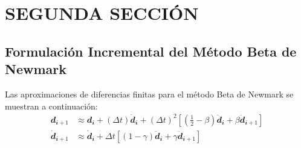 \section{SEGUNDA SECCIÓN}
	
	\subsection{Formulación Incremental del Método Beta de Newmark}

Las aproximaciones de diferencias finitas para el método Beta de Newmark se muestran a continuación:
\begin{subequations}\label{Cap3_Eq15}
  \begin{align}
\mathbfit{d_{i+1}}&\approx \mathbfit{d_{i}}+(\Delta t) \mathbfit{\dot{d}_{i}}+(\Delta t)^2\left[\left(\frac{1}{2}-\beta\right)\mathbfit{\ddot{d}_{i}}+\beta\mathbfit{\ddot{d}_{i+1}} \right]		\label{Cap3_Eq15_1} \\[2 mm]
\mathbfit{\dot{d}_{i+1}}&\approx \mathbfit{\dot{d}_{i}}+\Delta t\left [(1-\gamma)\mathbfit{\ddot{d}_{i}}+\gamma\mathbfit{\ddot{d}_{i+1}}\right] \label{Cap3_Eq15_2}
  \end{align}
\end{subequations}






